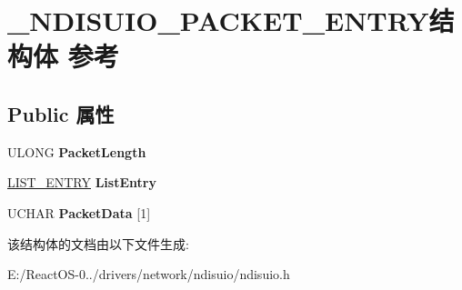 \hypertarget{struct___n_d_i_s_u_i_o___p_a_c_k_e_t___e_n_t_r_y}{}\section{\+\_\+\+N\+D\+I\+S\+U\+I\+O\+\_\+\+P\+A\+C\+K\+E\+T\+\_\+\+E\+N\+T\+R\+Y结构体 参考}
\label{struct___n_d_i_s_u_i_o___p_a_c_k_e_t___e_n_t_r_y}
\subsection*{Public 属性}
\begin{DoxyCompactItemize}
\item 
\mbox{\label{struct___n_d_i_s_u_i_o___p_a_c_k_e_t___e_n_t_r_y_ade383a02cc2162a3ec90ade4fc793fc7}} 
U\+L\+O\+NG {\bfseries Packet\+Length}
\item 
\mbox{\label{struct___n_d_i_s_u_i_o___p_a_c_k_e_t___e_n_t_r_y_ad25072166674ddbee2e9bccc31cc89cf}} 
\hyperlink{struct___l_i_s_t___e_n_t_r_y}{L\+I\+S\+T\+\_\+\+E\+N\+T\+RY} {\bfseries List\+Entry}
\item 
\mbox{\label{struct___n_d_i_s_u_i_o___p_a_c_k_e_t___e_n_t_r_y_a3cdb868b2448e4443146f592d0da6cb5}} 
U\+C\+H\+AR {\bfseries Packet\+Data} \mbox{[}1\mbox{]}
\end{DoxyCompactItemize}


该结构体的文档由以下文件生成\+:\begin{DoxyCompactItemize}
\item 
E\+:/\+React\+O\+S-\/0../drivers/network/ndisuio/ndisuio.\+h\end{DoxyCompactItemize}
